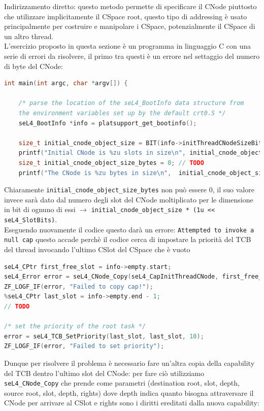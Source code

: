 Indirizzamento diretto: questo metodo permette di specificare il CNode piuttosto che utilizzare implicitamente il CSpace root, questo tipo di addressing  è usato principalmente per costruire e manipolare i CSpace, potenzialmente il CSpace di un altro thread.\\
L'esercizio proposto in questa sezione è un programma in linguaggio C con una serie di errori da risolvere, il primo tra questi è un errore nel settaggio del numero di byte del CNode:
\begin{lstlisting}[language=C++]
int main(int argc, char *argv[]) {

    /* parse the location of the seL4_BootInfo data structure from
    the environment variables set up by the default crt0.S */
    seL4_BootInfo *info = platsupport_get_bootinfo();

    size_t initial_cnode_object_size = BIT(info->initThreadCNodeSizeBits);
    printf("Initial CNode is %zu slots in size\n", initial_cnode_object_size);
    size_t initial_cnode_object_size_bytes = 0; // TODO
    printf("The CNode is %zu bytes in size\n", 	initial_cnode_object_size_bytes);
\end{lstlisting}
Chiaramente \texttt{initial\_cnode\_object\_size\_bytes} non può essere 0, il suo valore invece sarà dato dal numero degli slot del CNode moltiplicato per le dimensione in bit di ognuno di essi $\rightarrow$ \texttt{initial\_cnode\_object\_size * (1u << seL4\_SlotBits)}.\\
Eseguendo nuovamente il codice questo darà un errore: \texttt{Attempted to invoke a null cap} questo accade perchè il codice cerca di impostare la priorità del TCB del thread invocando l'ultimo CSlot del CSpace che è vuoto
\begin{lstlisting}[language=C++]
seL4_CPtr first_free_slot = info->empty.start;
seL4_Error error = seL4_CNode_Copy(seL4_CapInitThreadCNode, first_free_slot, seL4_WordBits, seL4_CapInitThreadCNode, seL4_CapInitThreadTCB, seL4_WordBits, seL4_AllRights);
ZF_LOGF_IF(error, "Failed to copy cap!");
%seL4_CPtr last_slot = info->empty.end - 1;
// TODO

/* set the priority of the root task */
error = seL4_TCB_SetPriority(last_slot, last_slot, 10);
ZF_LOGF_IF(error, "Failed to set priority");
\end{lstlisting}
Dunque per risolvere il problema è necessario fare un'altra copia della capability del TCB dentro l'ultimo slot del CNode: per fare ciò utilizziamo \texttt{seL4\_CNode\_Copy} che prende come parametri (destination root, slot, depth, source root, slot, depth, rights) dove depth indica quanto bisogna attraversare il CNode per arrivare al CSlot e rights sono i diritti ereditati dalla nuova capability:
